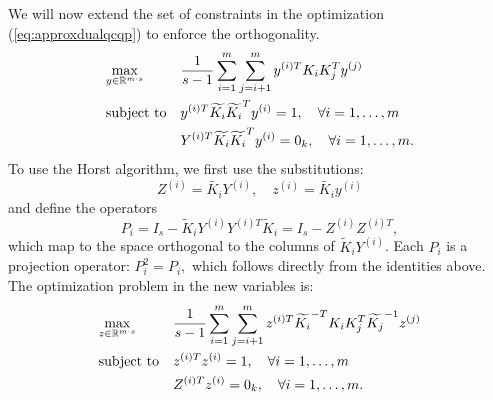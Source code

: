 
We will now extend the set of constraints in the optimization (\ref{eq:approxdualqcqp}) to enforce the orthogonality.
%
 \begin{equation}\label{eq:kdimapproxdualqcqp}
\begin{aligned}
& \underset{y \in \RR^{m\cdot s}}{\text{max}}
& & \frac{1}{s -1} \sum_{i = 1}^m \sum_{j = i+1}^m y^{(i)T} K_i K_j^T y^{(j)}\\%
& \text{subject to}
& & y^{(i)T} \widetilde{K_i} \widetilde{K_i}^T y^{(i)} = 1, \quad\forall i = 1,\ldots, m\\
& & & Y^{(i)T} \widetilde{K_i} \widetilde{K_i}^T y^{(i)} = 0_k, \quad\forall i = 1,\ldots, m.
\end{aligned}
\end{equation}
%
%
To use the Horst algorithm, we first use the substitutions:
$$Z^{(i)} = \widetilde{K_i}Y^{(i)}, \quad z^{(i)} = \widetilde{K_i}y^{(i)}$$
and define the operators $$P_i = I_s - \widetilde{K}_i Y^{(i)} Y^{(i)T} \widetilde{K}_i = I_s - Z^{(i)} Z^{(i)T},$$ which map to the space orthogonal to the columns of $\widetilde{K}_i Y^{(i)}$. Each $P_i$ is a projection operator: $P_i^2 = P_i,$ which follows directly from the identities above.
The optimization problem in the new variables is:
%
 \begin{equation}\label{eq:Zkdimapproxdualqcqp}
\begin{aligned}
& \underset{z \in \RR^{m\cdot s}}{\text{max}}
& & \frac{1}{s -1} \sum_{i = 1}^m \sum_{j = i+1}^m z^{(i)T} \widetilde{K_i}^{-T} K_i K_j^T \widetilde{K_j}^{-1} z^{(j)} \\%
& \text{subject to}
& & z^{(i)T}  z^{(i)} = 1, \quad\forall i = 1,\ldots, m\\
& & & Z^{(i)T} z^{(i)} = 0_k, \quad\forall i = 1,\ldots, m.
\end{aligned}
\end{equation}
